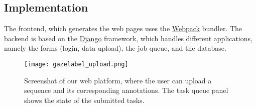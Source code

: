 \subsection{Implementation}
The frontend, which generates the web pages uses the \href{https://webpack.js.org}{Webpack} bundler.
The backend is based on the \href{https://www.djangoproject.com/}{Django} framework, which handles different applications, namely the forms (login, data upload), the job queue, and the database.

\begin{figure}[!htpb]
  \texttt{[image: gazelabel\_upload.png]}
  \caption{Screenshot of our web platform, where the user can upload a sequence and its corresponding annotations. The task queue panel shows the state of the submitted tasks.}
  \label{fig:anna_upload}
\end{figure}

